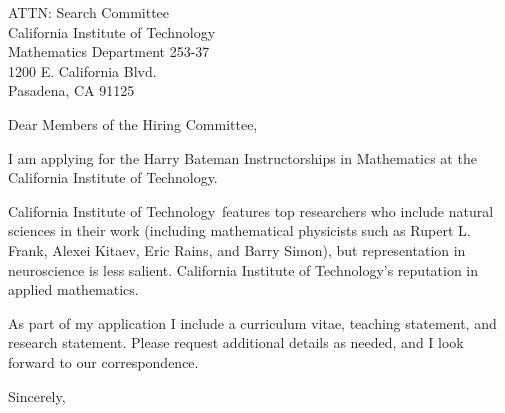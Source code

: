 \documentclass[11pt,a4paper]{letter}
\begin{document}

\def\School{California Institute of Technology}

\begin{letter}
{ATTN: Search Committee\\
California Institute of Technology\\
Mathematics Department 253-37\\
1200 E. California Blvd.\\
Pasadena, CA 91125}


\opening{Dear Members of the Hiring Committee,}

I am applying for the Harry Bateman Instructorships in Mathematics at the \School. 



\School~features top researchers who include natural sciences in their work (including mathematical physicists such as Rupert L. Frank, Alexei Kitaev, Eric Rains, and Barry Simon), but representation in neuroscience is less salient. \School's reputation in applied mathematics.



As part of my application I include a curriculum vitae, teaching statement, and research statement. Please request additional details as needed, and I look forward to our correspondence.

\closing{Sincerely,}
\end{letter}
\end{document}

